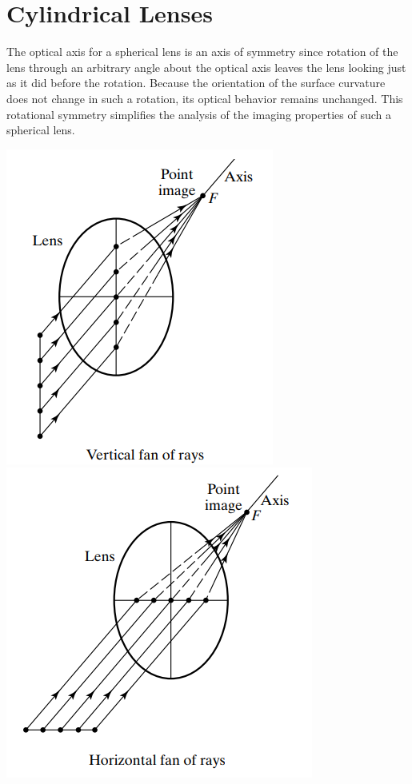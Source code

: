 \documentclass[11pt]{book}
\theoremstyle{break}
\theoremstyle{break}
\begin{document}
\newpage
\section[Cylindrical Lenses]{\color{red}Cylindrical Lenses\color{black}}
The optical axis for a spherical lens is an axis of symmetry since rotation of the lens through an arbitrary angle about the optical axis leaves the lens looking just as it did before the rotation. Because the orientation of the surface curvature does not change in such a rotation, its optical behavior remains unchanged. This rotational symmetry simplifies the analysis of the imaging properties of such a spherical lens. 
\begin{center}
\includegraphics[scale=0.65]{sphereSym.png}\quad
\includegraphics[scale=0.65]{sphereSym1.png}
\end{center}
\end{document}
